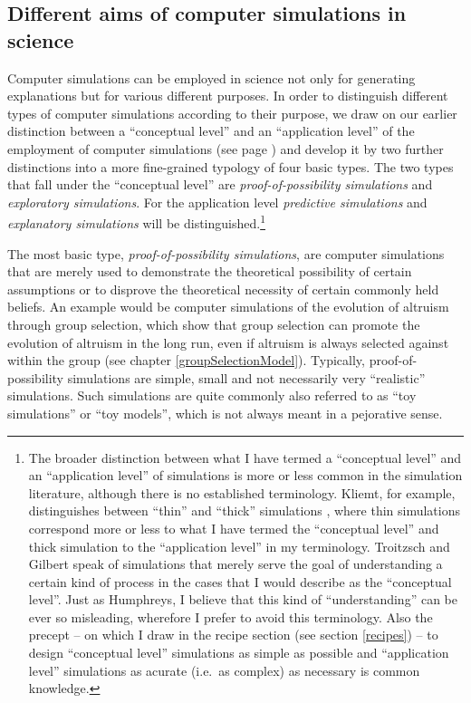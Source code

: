 \subsection{Different aims of computer simulations in science}
\label{differentAims}
Computer simulations can be employed in science not only for generating
explanations but for various different purposes.  In order to distinguish
different types of computer simulations according to their purpose, we draw on
our earlier distinction between a ``conceptual level'' and an ``application
level'' of the employment of computer simulations (see page
\pageref{twoLevelDistinction}) and develop it by two further distinctions into
a more fine-grained typology of four basic types. The two types that fall
under the ``conceptual level'' are {\em proof-of-possibility simulations} and
{\em exploratory simulations}. For the application level {\em predictive
  simulations} and {\em explanatory simulations} will be
distinguished.\footnote{The broader distinction between what I have termed a
  ``conceptual level'' and an ``application level'' of simulations is more or
  less common in the simulation literature, although there is no established
  terminology. Kliemt, for example, distinguishes between ``thin'' and
  ``thick'' simulations \cite[p. 15]{kliemt:1996}, where thin simulations
  correspond more or less to what I have termed the ``conceptual level'' and
  thick simulation to the ``application level'' in my terminology.  Troitzsch
  and Gilbert speak of simulations that merely serve the goal of understanding
  a certain kind of process \cite[p. 15ff.]{troitzsch:2005} in the cases that
  I would describe as the ``conceptual level''. Just as Humphreys, I believe
  that this kind of ``understanding'' can be ever so misleading, wherefore I
  prefer to avoid this terminology. Also the precept -- on which I draw in
  the recipe section (see section \ref{recipes}) -- to design ``conceptual
  level'' simulations as simple as possible and ``application level''
  simulations as acurate (i.e.\ as complex) as necessary is common knowledge.}

The most basic type, {\em proof-of-possibility simulations}, are computer
simulations that are merely used to demonstrate the theoretical possibility of
certain assumptions or to disprove the theoretical necessity of certain
commonly held beliefs. An example would be computer simulations of the
evolution of altruism through group selection, which show that group selection
can promote the evolution of altruism in the long run, even if altruism is
always selected against within the group (see chapter
\ref{groupSelectionModel}).  Typically, proof-of-possibility simulations are
simple, small and not necessarily very ``realistic'' simulations. Such
simulations are quite commonly also referred to as ``toy simulations'' or
``toy models'', which is not always meant in a pejorative sense.

